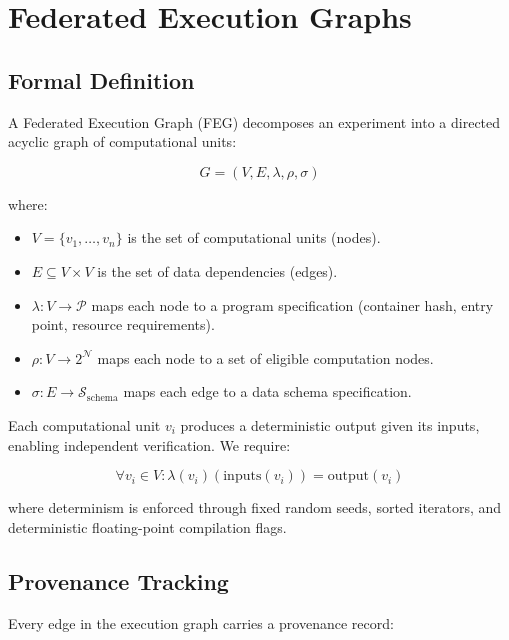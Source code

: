 \section{Federated Execution Graphs}

\label{sec:execution}

\subsection{Formal Definition}

A Federated Execution Graph (FEG) decomposes an experiment into a directed acyclic graph of computational units:

\begin{equation}
    G = (V, E, \lambda, \rho, \sigma)
\end{equation}

\noindent where:
\begin{itemize}[leftmargin=*]
    \item $V = \{v_1, \ldots, v_n\}$ is the set of computational units (nodes).
    \item $E \subseteq V \times V$ is the set of data dependencies (edges).
    \item $\lambda: V \rightarrow \mathcal{P}$ maps each node to a program specification (container hash, entry point, resource requirements).
    \item $\rho: V \rightarrow 2^{\mathcal{N}}$ maps each node to a set of eligible computation nodes.
    \item $\sigma: E \rightarrow \mathcal{S}_{\text{schema}}$ maps each edge to a data schema specification.
\end{itemize}

Each computational unit $v_i$ produces a deterministic output given its inputs, enabling independent verification.
We require:

\begin{equation}
    \forall v_i \in V: \lambda(v_i)(\text{inputs}(v_i)) = \text{output}(v_i)
\end{equation}

\noindent where determinism is enforced through fixed random seeds, sorted iterators, and deterministic floating-point compilation flags.

\subsection{Provenance Tracking}

Every edge in the execution graph carries a provenance record:

